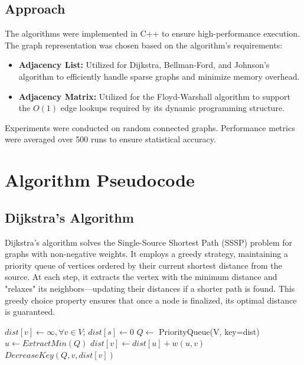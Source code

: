 \documentclass[12pt, a4paper]{article}
\begin{document}
\subsection{Approach}
The algorithms were implemented in C++ to ensure high-performance execution. The graph representation was chosen based on the algorithm's requirements:
\begin{itemize}
    \item \textbf{Adjacency List:} Utilized for Dijkstra, Bellman-Ford, and Johnson’s algorithm to efficiently handle sparse graphs and minimize memory overhead.
    \item \textbf{Adjacency Matrix:} Utilized for the Floyd-Warshall algorithm to support the $O(1)$ edge lookups required by its dynamic programming structure.
\end{itemize}

Experiments were conducted on random connected graphs. Performance metrics were averaged over 500 runs to ensure statistical accuracy.

\clearpage

\section{Algorithm Pseudocode}

\subsection{Dijkstra's Algorithm}
Dijkstra's algorithm solves the Single-Source Shortest Path (SSSP) problem for graphs with non-negative weights. It employs a greedy strategy, maintaining a priority queue of vertices ordered by their current shortest distance from the source. At each step, it extracts the vertex with the minimum distance and "relaxes" its neighbors—updating their distances if a shorter path is found. This greedy choice property ensures that once a node is finalized, its optimal distance is guaranteed.

\begin{algorithm}[H]
\caption{Dijkstra(G, s)}
\begin{algorithmic}[1]
\State $dist[v] \gets \infty, \forall v \in V$; $dist[s] \gets 0$
\State $Q \gets$ PriorityQueue(V, key=dist)
    \State $u \gets ExtractMin(Q)$
            \State $dist[v] \gets dist[u] + w(u,v)$
            \State $DecreaseKey(Q, v, dist[v])$
        \EndIf
    \EndFor
\EndWhile
\end{algorithmic}
\end{algorithm}
\end{document}
